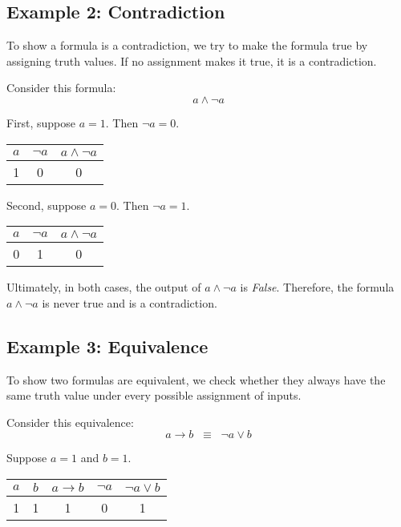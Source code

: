 \documentclass[12pt,a4paper,openany]{article}
\begin{document}
\subsection{Example 2: Contradiction}

To show a formula is a contradiction, we try to make the formula true by assigning truth values. If no assignment makes it true, it is a contradiction.

Consider this formula:
$$ a \land \neg a $$

First, suppose $a = 1$. Then $\neg a = 0$.

\begin{center}
\begin{tabular}{|c|c|c|}
\hline
$a$ & $\neg a$ & $a \land \neg a$ \\
\hline
\textcolor{truecolor}{1} & \textcolor{falsecolor}{0} & \textcolor{falsecolor}{0} \\
\hline
\end{tabular}
\end{center}

Second, suppose $a = 0$. Then $\neg a = 1$.

\begin{center}
\begin{tabular}{|c|c|c|}
\hline
$a$ & $\neg a$ & $a \land \neg a$ \\
\hline
\textcolor{falsecolor}{0} & \textcolor{truecolor}{1} & \textcolor{falsecolor}{0} \\
\hline
\end{tabular}
\end{center}

Ultimately, in both cases, the output of $a \land \neg a$ is \textit{False}. Therefore, the formula $a \land \neg a$ is never true and is a contradiction.

\subsection{Example 3: Equivalence}

To show two formulas are equivalent, we check whether they always have the same truth value under every possible assignment of inputs.

Consider this equivalence:
$$ a \rightarrow b \;\;\equiv\;\; \neg a \lor b $$

Suppose $a = 1$ and $b = 1$.

\begin{center}
\begin{tabular}{|c|c|c|c|c|}
\hline
$a$ & $b$ & $a \rightarrow b$ & $\neg a$ & $\neg a \lor b$ \\
\hline
\textcolor{truecolor}{1} & \textcolor{truecolor}{1} & \textcolor{truecolor}{1} & \textcolor{falsecolor}{0} & \textcolor{truecolor}{1} \\
\hline
\end{tabular}
\end{center}
\end{document}
